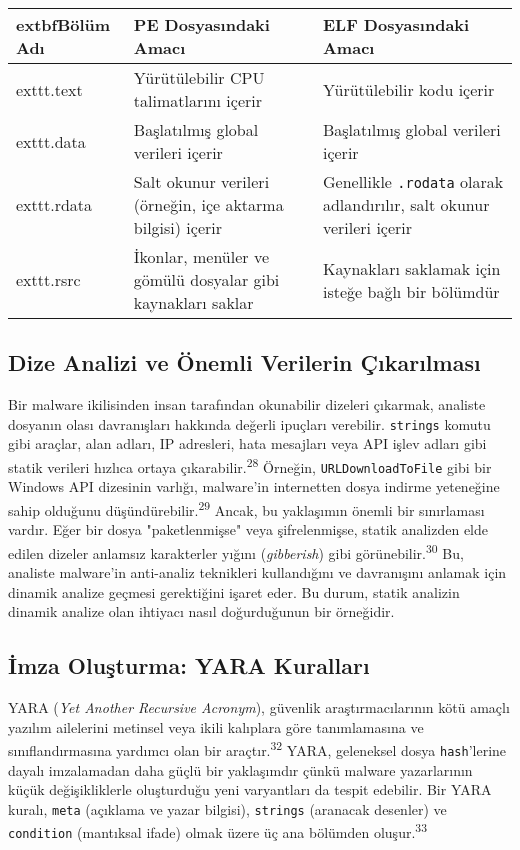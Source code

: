 \begin{tabular}{|p{4cm}|p{6cm}|p{4cm}|}
\hline
\hline
	extbf{Bölüm Adı} & \textbf{PE Dosyasındaki Amacı} & \textbf{ELF Dosyasındaki Amacı}  \\
\hline
\hline
	exttt{.text} & Yürütülebilir CPU talimatlarını içerir & Yürütülebilir kodu içerir  \\
\hline
\hline
	exttt{.data} & Başlatılmış global verileri içerir & Başlatılmış global verileri içerir  \\
\hline
\hline
	exttt{.rdata} & Salt okunur verileri (örneğin, içe aktarma bilgisi) içerir & Genellikle \texttt{.rodata} olarak adlandırılır, salt okunur verileri içerir  \\
\hline
\hline
	exttt{.rsrc} & İkonlar, menüler ve gömülü dosyalar gibi kaynakları saklar & Kaynakları saklamak için isteğe bağlı bir bölümdür  \\
\hline
\hline
\hline
\end{tabular}

\subsection{Dize Analizi ve Önemli Verilerin Çıkarılması}

Bir malware ikilisinden insan tarafından okunabilir dizeleri çıkarmak, analiste dosyanın olası davranışları hakkında değerli ipuçları verebilir. \texttt{strings} komutu gibi araçlar, alan adları, IP adresleri, hata mesajları veya API işlev adları gibi statik verileri hızlıca ortaya çıkarabilir.\textsuperscript{28} Örneğin, \texttt{URLDownloadToFile} gibi bir Windows API dizesinin varlığı, malware'in internetten dosya indirme yeteneğine sahip olduğunu düşündürebilir.\textsuperscript{29} Ancak, bu yaklaşımın önemli bir sınırlaması vardır. Eğer bir dosya "paketlenmişse" veya şifrelenmişse, statik analizden elde edilen dizeler anlamsız karakterler yığını (\textit{gibberish}) gibi görünebilir.\textsuperscript{30} Bu, analiste malware'in anti-analiz teknikleri kullandığını ve davranışını anlamak için dinamik analize geçmesi gerektiğini işaret eder. Bu durum, statik analizin dinamik analize olan ihtiyacı nasıl doğurduğunun bir örneğidir.

\subsection{İmza Oluşturma: YARA Kuralları}

YARA (\textit{Yet Another Recursive Acronym}), güvenlik araştırmacılarının kötü amaçlı yazılım ailelerini metinsel veya ikili kalıplara göre tanımlamasına ve sınıflandırmasına yardımcı olan bir araçtır.\textsuperscript{32} YARA, geleneksel dosya \texttt{hash}'lerine dayalı imzalamadan daha güçlü bir yaklaşımdır çünkü malware yazarlarının küçük değişikliklerle oluşturduğu yeni varyantları da tespit edebilir. Bir YARA kuralı, \texttt{meta} (açıklama ve yazar bilgisi), \texttt{strings} (aranacak desenler) ve \texttt{condition} (mantıksal ifade) olmak üzere üç ana bölümden oluşur.\textsuperscript{33}

